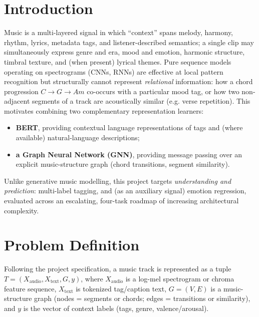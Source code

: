 \documentclass[10pt,twocolumn]{article}
\begin{document}
\section{Introduction}
Music is a multi-layered signal in which ``context'' spans melody, harmony,
rhythm, lyrics, metadata tags, and listener-described semantics; a single
clip may simultaneously express genre and era, mood and emotion, harmonic
structure, timbral texture, and (when present) lyrical themes. Pure sequence
models operating on spectrograms (CNNs, RNNs) are effective at local
pattern recognition but structurally cannot represent \emph{relational}
information: how a chord progression $C \rightarrow G \rightarrow Am$
co-occurs with a particular mood tag, or how two non-adjacent segments of a
track are acoustically similar (e.g. verse repetition). This motivates
combining two complementary representation learners:

\begin{itemize}
  \item \textbf{BERT}, providing contextual language representations of
  tags and (where available) natural-language descriptions;
  \item \textbf{a Graph Neural Network (GNN)}, providing message passing
  over an explicit music-structure graph (chord transitions, segment
  similarity).
\end{itemize}

Unlike generative music modelling, this project targets
\emph{understanding and prediction}: multi-label tagging, and (as an
auxiliary signal) emotion regression, evaluated across an escalating,
four-task roadmap of increasing architectural complexity.

\section{Problem Definition}
Following the project specification, a music track is represented as a
tuple $T = (X_{\text{audio}}, X_{\text{text}}, G, y)$, where $X_{\text{audio}}$
is a log-mel spectrogram or chroma feature sequence, $X_{\text{text}}$ is
tokenized tag/caption text, $G=(V,E)$ is a music-structure graph (nodes =
segments or chords; edges = transitions or similarity), and $y$ is the
vector of context labels (tags, genre, valence/arousal).
\end{document}
